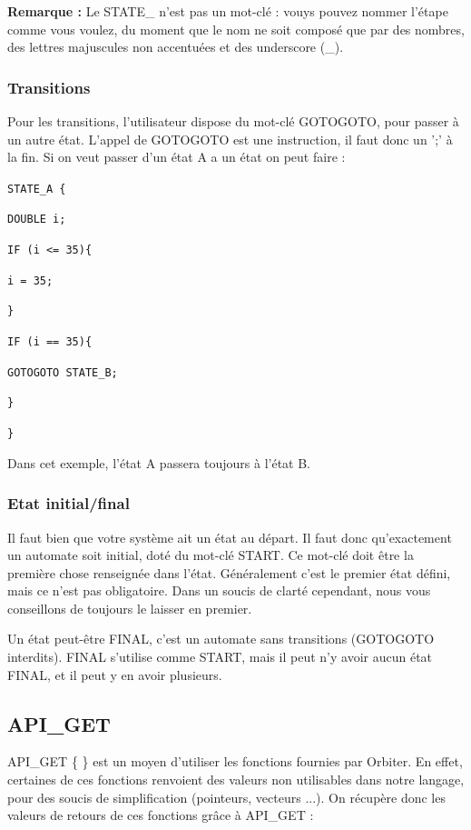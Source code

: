 \documentclass[a4paper,11pt]{article}
\begin{document}
\textbf{Remarque :} Le STATE\_ n'est pas un mot-clé : vouys pouvez nommer l'étape comme vous voulez, du moment que le nom ne soit composé que par des nombres, des lettres majuscules non accentuées et des underscore (\_).

\subsubsection{Transitions}
Pour les transitions, l'utilisateur dispose du mot-clé GOTOGOTO, pour passer à un autre état. L'appel de GOTOGOTO est une instruction, il faut donc un ';' à la fin. 
Si on veut passer d'un état A a un état on peut faire : 
\newline

\texttt{STATE\_A \{}

\texttt{\quad DOUBLE i;}
			
\texttt{\quad	IF (i <= 35)\{}
	
\texttt{\qquad i = 35;}
			
\texttt{\quad \}}
	
\texttt{\quad IF (i == 35)\{}
	
\texttt{\qquad GOTOGOTO STATE\_B; }
		
\texttt{\quad \}}
	
\texttt{\}}

Dans cet exemple, l'état A passera toujours à l'état B.

\subsubsection{Etat initial/final}

Il faut bien que votre système ait un état au départ. Il faut donc qu'exactement un automate soit initial, doté du mot-clé START. Ce mot-clé doit être la première chose renseignée dans l'état.  
Généralement c'est le premier état défini, mais ce n'est pas obligatoire. Dans un soucis de clarté cependant, nous vous conseillons de toujours le laisser en premier.

Un état peut-être FINAL, c'est un automate sans transitions (GOTOGOTO interdits). FINAL s'utilise comme START, mais il peut n'y avoir aucun état FINAL, et il peut y en avoir plusieurs.

\subsection{API\_GET}

API\_GET \{ \} est un moyen d'utiliser les fonctions fournies par Orbiter. En effet, certaines de ces fonctions renvoient des valeurs non utilisables dans notre langage, pour des soucis de simplification (pointeurs, vecteurs ...). On récupère donc les valeurs de retours de ces fonctions grâce à API\_GET :
\end{document}
